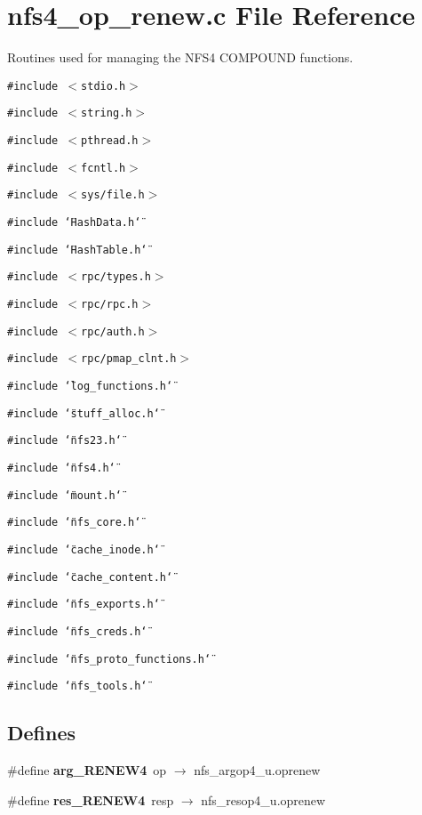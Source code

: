 \section{nfs4\_\-op\_\-renew.c File Reference}
\label{nfs4__op__renew_8c}
Routines used for managing the NFS4 COMPOUND functions. 

{\tt \#include $<$stdio.h$>$}\par
{\tt \#include $<$string.h$>$}\par
{\tt \#include $<$pthread.h$>$}\par
{\tt \#include $<$fcntl.h$>$}\par
{\tt \#include $<$sys/file.h$>$}\par
{\tt \#include \char`\"{}Hash\-Data.h\char`\"{}}\par
{\tt \#include \char`\"{}Hash\-Table.h\char`\"{}}\par
{\tt \#include $<$rpc/types.h$>$}\par
{\tt \#include $<$rpc/rpc.h$>$}\par
{\tt \#include $<$rpc/auth.h$>$}\par
{\tt \#include $<$rpc/pmap\_\-clnt.h$>$}\par
{\tt \#include \char`\"{}log\_\-functions.h\char`\"{}}\par
{\tt \#include \char`\"{}stuff\_\-alloc.h\char`\"{}}\par
{\tt \#include \char`\"{}nfs23.h\char`\"{}}\par
{\tt \#include \char`\"{}nfs4.h\char`\"{}}\par
{\tt \#include \char`\"{}mount.h\char`\"{}}\par
{\tt \#include \char`\"{}nfs\_\-core.h\char`\"{}}\par
{\tt \#include \char`\"{}cache\_\-inode.h\char`\"{}}\par
{\tt \#include \char`\"{}cache\_\-content.h\char`\"{}}\par
{\tt \#include \char`\"{}nfs\_\-exports.h\char`\"{}}\par
{\tt \#include \char`\"{}nfs\_\-creds.h\char`\"{}}\par
{\tt \#include \char`\"{}nfs\_\-proto\_\-functions.h\char`\"{}}\par
{\tt \#include \char`\"{}nfs\_\-tools.h\char`\"{}}\par
\subsection*{Defines}
\begin{CompactItemize}
\item 
\#define {\bf arg\_\-RENEW4}\ op $\rightarrow$ nfs\_\-argop4\_\-u.oprenew
\item 
\#define {\bf res\_\-RENEW4}\ resp $\rightarrow$ nfs\_\-resop4\_\-u.oprenew
\end{CompactItemize}
